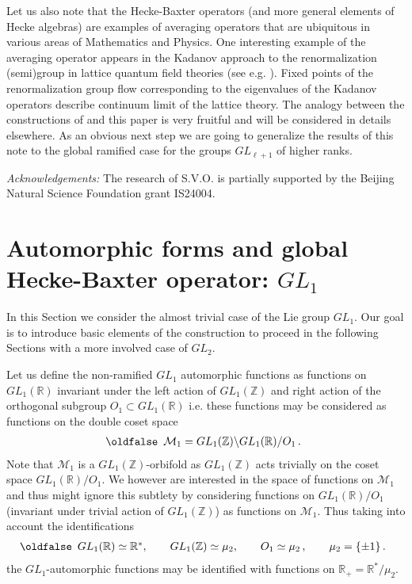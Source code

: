 \documentclass[12pt]{article}
\def\IR{\mathbb{R}}
\def\IZ{\mathbb{Z}}
\def\CM {\mathcal{M}}
\def\be{\begin{eqnarray}\new\begin{array}{cc}}
\def\ee{\end{array}\end{eqnarray}}
\newcounter{pac}[section]
\begin{document}
 Let us also note that
 the   Hecke-Baxter operators (and more general elements of Hecke algebras) are
examples of averaging operators that are ubiquitous in various areas of Mathematics
and Physics. One interesting example of the averaging operator appears
in  the  Kadanov approach to the renormalization (semi)group  in lattice
quantum field theories  (see e.g. \cite{Ka}). Fixed points of the
renormalization group flow corresponding to the eigenvalues of the Kadanov
operators describe continuum limit of the lattice
theory. The analogy between the constructions of \cite{Ka}  and this
paper is very fruitful and will be considered in details  elsewhere.   As an
obvious next step  we  are  going to generalize the results of
this note to the global ramified  case for the groups $GL_{\ell+1}$  of higher ranks.



{\it  Acknowledgements:} The research of S.V.O. is partially
supported by the Beijing Natural Science Foundation grant IS24004.



\section{Automorphic forms and global Hecke-Baxter operator:  $GL_1$ }


In this Section we consider the almost trivial case of the Lie group $GL_1$. Our
goal is to introduce  basic  elements of the construction to proceed in the following
Sections with a more involved  case of $GL_2$.

Let us define the non-ramified $GL_1$ automorphic functions  as
functions on  $GL_1(\IR)$  invariant under the left action of
$GL_1(\IZ)$ and right action of the orthogonal subgroup $O_1\subset
GL_1(\IR)$ i.e. these functions may be considered as functions on
the double coset space
\be\label{Mone}
\CM_1=GL_1(\IZ)\backslash GL_1(\IR)/O_1\,.
\ee
Note that $\CM_1$  is a $GL_1(\IZ)$-orbifold as $GL_1(\IZ)$
acts trivially on the coset space $GL_1(\IR)/O_1$. We however are
interested in the space of functions on $\CM_1$ and thus  might ignore this
subtlety by  considering  functions on
$GL_1(\IR)/O_1$ (invariant under trivial action of $GL_1(\IZ)$)
as functions on $\CM_1$. Thus taking into account the identifications
\be
GL_1(\IR)\simeq \IR^*, \qquad GL_1(\IZ)\simeq \mu_2, \qquad O_1\simeq
\mu_2\,,\qquad \mu_2=\{\pm 1\}\,.
\ee
the $GL_1$-automorphic functions may be identified with functions on
$\IR_+=\IR^*/\mu_2$.
\end{document}
